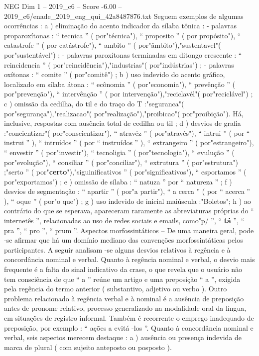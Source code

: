 \begin{textsample}{NEG Dim 1 – 2019\_c6 – Score -6.00 – 2019\_c6/enade\_2019\_eng\_qui\_42a8487876.txt}
Seguem exemplos de algumas ocorrências : a ) eliminação do acento indicador da sílaba tônica : - palavras proparoxítonas : “ tecnica ” ( por"técnica"), “ proposito ” ( por propósito"), “ catastrofe ” ( por catástrofe"), “ ambito ” ( por"âmbito"),"sustentavel"( por"sustentável") ; - palavras paroxítonas terminadas em ditongo crescente : “ reincidencia ” ( por"reincidência"),"industrias"( por"indústrias") ; - palavras oxítonas : “ comite ” ( por"comitê") ; b ) uso indevido do acento gráfico, localizado em sílaba átona : “ ecônomia ” ( por"economia"), “ prevênção ” ( por"prevenção"), “ intervênção ” ( por intervenção"),"reciclavél"( por"reciclável") ; c ) omissão da cedilha, do til e do traço do T :"seguranca"( por"segurança"),"realizacao"( por"realização"),"proibicao"( por"proibição").
Há, inclusive, respostas com ausência total de cedilha ou til ; d ) desvios de grafia :"concientizar"( por"conscientizar"), “ atravéz ” ( por"através"), “ intrui ” ( por “ instrui ” ), “ intruídos ” ( por “ instruídos ” ), “ extrangeiro ” ( por"estrangeiro"), “ envestir ” ( por"investir"), “ tecnoligia ” ( por"tecnologia"), “ evulução ” ( por"evolução"), “ consiliar ” ( por"conciliar"), “ extrutura ” ( por"estrutura") ;"serto ” ( por"\textbf{certo}"),"siguinificativos ” ( por"significativos"), “ esportamos ” ( por"exportamos") ; e ) omissão de sílaba : “ natuza ” por “ natureza ” ; f ) desvios de segmentação : “ apartir ” ( por"a partir"), “ a cerca ” ( por “ acerca ” ), “ oque ” ( por"o que") ; g ) uso indevido de inicial maiúscula :"Boletos"; h ) ao contrário do que se esperava, apareceram raramente as abreviaturas próprias do “ internetês ”, relacionadas ao uso de redes sociais e emails, como"p/ ”, “ \textbf{tá} ”, “ pra ”, “ pro ”, “ prum ”.
Aspectos morfossintáticos – De uma maneira geral, pode -se afirmar que há um domínio mediano das convenções morfossintáticas pelos participantes.
A seguir analisam -se alguns desvios relativos à regência e à concordância nominal e verbal.
Quanto à regência nominal e verbal, o desvio mais frequente é a falta do sinal indicativo da crase, o que revela que o usuário não tem consciência de que “ a ” reúne um artigo e uma preposição “ a ”, exigida pela regência do termo anterior ( substantivo, adjetivo ou verbo ).
Outro problema relacionado à regência verbal e à nominal é a ausência de preposição antes de pronome relativo, processo generalizado na modalidade oral da língua, em situações de registro informal.
Também é recorrente o emprego inadequado de preposição, por exemplo : “ ações a evitá -los ”.
Quanto à concordância nominal e verbal, seis aspectos merecem destaque : a ) ausência ou presença indevida de marca de plural ( com sujeito anteposto ou posposto ).

\end{textsample}
